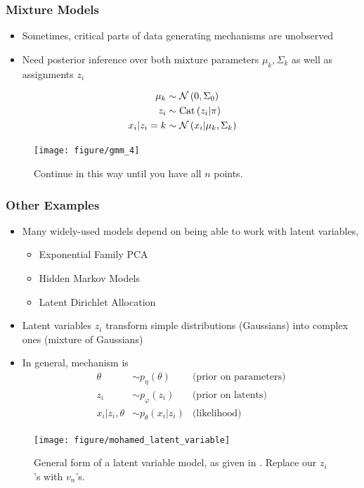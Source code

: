 \documentclass[10pt,mathserif]{beamer}
\begin{document}
\label{sec:latent_variable_models}
\begin{frame}
  \frametitle{Mixture Models}
  \begin{itemize}
  \item Sometimes, critical parts of data generating mechanisms are unobserved
    \item Need posterior inference over both mixture parameters $\mu_k,
      \Sigma_k$ as well as assignments $z_i$
  \end{itemize}
  \begin{align*}
    \mu_{k} &\sim \mathcal{N}\left(0, \Sigma_{0}\right) \\
    z_i &\sim \textnormal{Cat}\left(z_i \vert \pi\right) \\
    x_i \vert z_i = k &\sim \mathcal{N}\left(x_i \vert \mu_{k}, \Sigma_k\right)
  \end{align*}
\begin{figure}[ht]
  \centering
  \texttt{[image: figure/gmm\_4]}
  \caption{Continue in this way until you have all $n$ points. \label{fig:gmm_4}}
\end{figure}
\end{frame}

\begin{frame}
  \frametitle{Other Examples}
  \begin{itemize}
  \item Many widely-used models depend on being able to work with latent variables,
    \begin{itemize}
    \item Exponential Family PCA
    \item Hidden Markov Models
    \item Latent Dirichlet Allocation
    \end{itemize}
  \item Latent variables $z_i$ transform simple distributions (Gaussians) into
    complex ones (mixture of Gaussians)
  \item In general, mechanism is
    \begin{align*}
      \theta &\sim p_{\eta}\left(\theta\right) &\text{(prior on parameters)} \\
      z_{i} &\sim p_{\varphi}\left(z_{i}\right) &\text{(prior on latents)} \\
      x_{i} \vert z_{i}, \theta &\sim p_{\theta}\left(x_{i} \vert z_{i} \right) &\text{(likelihood)}
    \end{align*}
  \end{itemize}
  \begin{figure}[ht]
    \centering
    \texttt{[image: figure/mohamed\_latent\_variable]}
    \caption{General form of a latent variable model, as given in
      \citep{mohamed2011generalised}. Replace our $z_i$'s with
      $v_n$'s. \label{fig:mohamed_latent_variable} }
  \end{figure}
\end{frame}
\end{document}
